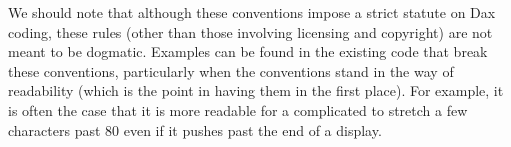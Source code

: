 We should note that although these conventions impose a strict statute on
Dax coding, these rules (other than those involving licensing and
copyright) are not meant to be dogmatic. Examples can be found in the
existing code that break these conventions, particularly when the
conventions stand in the way of readability (which is the point in having
them in the first place). For example, it is often the case that it is more
readable for a complicated  to stretch a few characters
past 80 even if it pushes past the end of a display.

